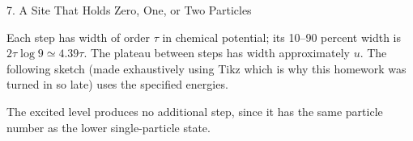 \documentclass[11pt]{article}
\begin{document}
\begin{problem}{7. A Site That Holds Zero, One, or Two Particles}
\begin{enumerate}[label=(\alph*)]
\begin{answer}
\begin{equation}
\end{equation}
Each step has width of order \(\tau\) in chemical potential; its 10--90 percent width is \(2\tau\log9\simeq4.39\tau\). The plateau between steps has width approximately \(u\). The following sketch (made exhaustively using Tikz which is why this homework was turned in so late) uses the specified energies.
\begin{center}
\end{center}
The excited level produces no additional step, since it has the same particle number as the lower single-particle state.
\end{answer}
\end{enumerate}
\end{problem}
\end{document}
